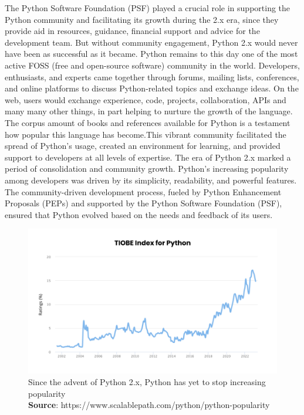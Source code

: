 \documentclass[twoside,final]{hcmut-report}
\begin{document}
\hspace*{3mm} The Python Software Foundation (PSF) played a crucial role in supporting the Python community and facilitating its growth during the 2.x era, since they provide aid in resources, guidance, financial support and advice for the development team. But without community engagement, Python 2.x would never have been as successful as it became. Python remains to this day one of the most active FOSS (free and open-source software) community in the world. Developers, enthusiasts, and experts came together through forums, mailing lists, conferences, and online platforms to discuss Python-related topics and exchange ideas. On the web, users would exchange experience, code, projects, collaboration, APIs and many many other things, in part helping to nurture the growth of the language. The corpus amount of books and references available for Python is a testament how popular this language has become.This vibrant community facilitated the spread of Python's usage, created an environment for learning, and provided support to developers at all levels of expertise. The era of Python 2.x marked a period of consolidation and community growth. Python's increasing popularity among developers was driven by its simplicity, readability, and powerful features. The community-driven development process, fueled by Python Enhancement Proposals (PEPs) and supported by the Python Software Foundation (PSF), ensured that Python evolved based on the needs and feedback of its users. 

\begin{figure}[ht]
\centering
\includegraphics[width=\textwidth]{graphics/popularity}
\caption{Since the advent of Python 2.x, Python has yet to stop increasing popularity\\ \textbf{Source}: https://www.scalablepath.com/python/python-popularity}
\end{figure}
\end{document}
